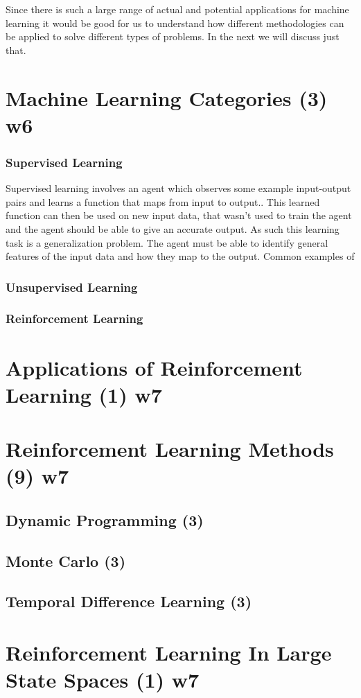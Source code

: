 Since there is such a large range of actual and potential applications for machine learning it would be good for
us to understand how different methodologies can be applied to solve different types of problems.
In the next we will discuss just that.


\section{Machine Learning Categories (3) w6}\label{sec:mlCategories}

\subsubsection{Supervised Learning}
Supervised learning involves an agent which observes some example input-output pairs and learns
a function that maps from input to output.\cite{russell2016artificial}.
This learned function can then be used on new input data, that wasn't used to train the agent and the
agent should be able to give an accurate output.
As such this learning task is a generalization problem.
The agent must be able to identify general features of the input data and how they map to the output.
Common examples of 


\subsubsection{Unsupervised Learning}
\subsubsection{Reinforcement Learning}


\section{Applications of Reinforcement Learning (1) w7}\label{sec:rlApplications}


\section{Reinforcement Learning Methods (9) w7}\label{sec:rlMethods}

\subsection{Dynamic Programming (3)}\label{subsec:dp}

\subsection{Monte Carlo (3)}\label{subsec:mc}

\subsection{Temporal Difference Learning (3)}\label{subsec:td}


\section{Reinforcement Learning In Large State Spaces (1) w7}\label{sec:rlLargeStateSpace}